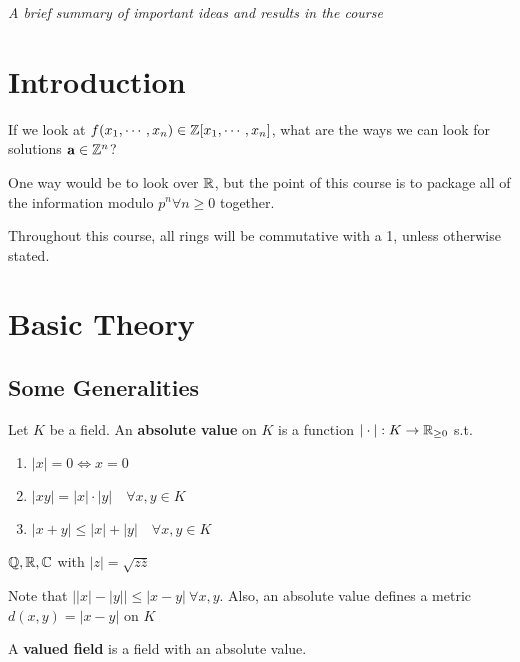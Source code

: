\documentclass[a4paper]{article}
\begin{document}
\maketitle
{\small \centering
\noindent\emph{A brief summary of important ideas and results in the course}

\setcounter{section}{-1}
\section{Introduction}
If we look at $f(x_1, \cdots, x_n)\in\mathbb{Z}[x_1,\cdots,x_n]$, what are the ways we can look for solutions $\mathbf{a}\in\mathbb{Z}^n$?

One way would be to look over $\mathbb{R}$, but the point of this course is to package all of the information modulo $p^n\forall n\geq0$ together. 

\begin{notation}
	Throughout this course, all rings will be commutative with a 1, unless otherwise stated.
\end{notation}

\section{Basic Theory}

\subsection{Some Generalities}
\begin{defi-num}
	Let $K$ be a field. An \textbf{absolute value} on $K$ is a function $|\cdot|:K\rightarrow\mathbb{R}_{\geq 0}$ s.t.
	\begin{enumerate}
		\item $|x|=0\iff x=0$\\
		\item $|xy|=|x|\cdot|y|\quad\forall x,y\in K$\\
		\item $|x+y|\leq|x|+|y|\quad\forall x,y\in K$
	\end{enumerate}
\end{defi-num}
\begin{eg}
	$\mathbb{Q},\mathbb{R},\mathbb{C}$ with $|z|=\sqrt{z\overline{z}}$
\end{eg}
Note that $\left||x| - |y|\right|\leq|x-y|\ \forall x,y$. Also, an absolute value defines a metric $d(x,y)=|x-y|$ on $K$

\begin{defi-num}
	A \textbf{valued field} is a field with an absolute value.
\end{defi-num}

}
\end{document}
